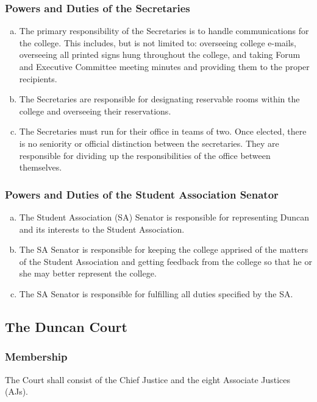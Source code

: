 \documentclass[USletter,12pt]{article}
\begin{document}
\subsubsection{Powers and Duties of the Secretaries}
\begin{enumerate}[(a)]
\item The primary responsibility of the Secretaries is to handle communications for the college.  This includes, but is not limited to: overseeing college e-mails, overseeing all printed signs hung throughout the college, and taking Forum and Executive Committee meeting minutes and providing them to the proper recipients.
\item The Secretaries are responsible for designating reservable rooms within the college and overseeing their reservations.
\item The Secretaries must run for their office in teams of two.  Once elected, there is no seniority or official distinction between the secretaries.  They are responsible for dividing up the responsibilities of the office between themselves.
\end{enumerate}

\subsubsection{Powers and Duties of the Student Association Senator}
\begin{enumerate}[(a)]
\item The Student Association (SA) Senator is responsible for representing Duncan and its interests to the Student Association.
\item The SA Senator is responsible for keeping the college apprised of the matters of the Student Association and getting feedback from the college so that he or she may better represent the college.
\item The SA Senator is responsible for fulfilling all duties specified by the SA.
\end{enumerate}

\subsection{The Duncan Court}
\subsubsection{Membership}
The Court shall consist of the Chief Justice and the eight Associate Justices (AJs).
\end{document}
